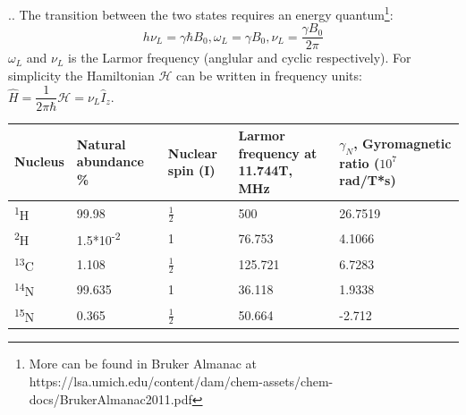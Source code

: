 \documentclass{beamer}
\begin{document}
\begin{frame}{\thesection.\thesubsection. \insertsubsection}
 The transition between the two states requires an energy quantum\footnote{More can be found in Bruker Almanac at https://lsa.umich.edu/content/dam/chem-assets/chem-docs/BrukerAlmanac2011.pdf}:
		\begin{equation}
			h \nu_L = \gamma \hbar B_0, \omega_L = \gamma B_0, \nu_L = \dfrac{\gamma B_0}{2 \pi}
		\end{equation}
		$\omega_L$ and $\nu_L$ is the Larmor frequency (anglular and cyclic respectively).
		For simplicity the Hamiltonian $\mathcal{H}$ can be written in frequency units: $\hat{H} = \dfrac{1}{2 \pi \hbar} \mathcal{H} = \nu_L \hat{I}_z $.

		
\begin{table}[ht]
	\centering
	\begin{tabular}{  C{1.0cm}  C{2.5cm}  C{1.0cm}  C{2.0cm}  C{2.0cm}}
		\hline\hline
		Nucleus & Natural abundance \% & Nuclear spin (I) & Larmor frequency at 11.744T, MHz & $\gamma_N$, Gyromagnetic ratio ($10^7$ rad/T*s) \\
		\hline
		\textsuperscript{1}H & 99.98 & $\frac{1}{2}$ & 500 & 26.7519 \\
		\textsuperscript{2}H & 1.5*10\textsuperscript{-2} & 1 & 76.753 & 4.1066 \\
		\textsuperscript{13}C & 1.108 & $\frac{1}{2}$ & 125.721 & 6.7283 \\
		\textsuperscript{14}N & 99.635 & 1 & 36.118 & 1.9338 \\
		\textsuperscript{15}N & 0.365 &  $\frac{1}{2}$ & 50.664 & -2.712 \\
		\hline
	\end{tabular}
\end{table}

\end{frame}
\end{document}
